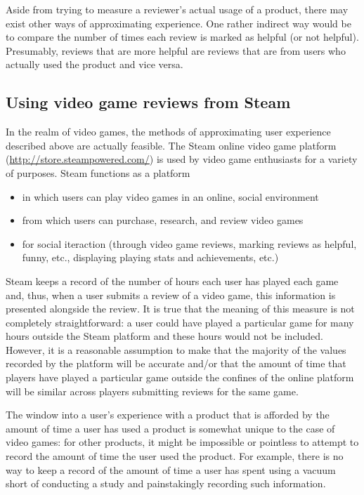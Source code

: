 \documentclass[9pt]{article}
\begin{document}
Aside from trying to measure a reviewer's actual usage of a product, there may exist other ways of approximating experience. One rather indirect way would be to compare the number of times each review is marked as helpful (or not helpful). Presumably, reviews that are more helpful are reviews that are from users who actually used the product and vice versa.

\subsection{Using video game reviews from Steam}

In the realm of video games, the methods of approximating user experience described above are actually feasible. The Steam online video game platform (\url{http://store.steampowered.com/}) is used by video game enthusiasts for a variety of purposes. Steam functions as a platform

\begin{itemize}
\item in which users can play video games in an online, social environment
\item from which users can purchase, research, and review video games
\item for social iteraction (through video game reviews, marking reviews as helpful, funny, etc., displaying playing stats and achievements, etc.)
\end{itemize}

Steam keeps a record of the number of hours each user has played each game and, thus, when a user submits a review of a video game, this information is presented alongside the review. It is true that the meaning of this measure is not completely straightforward: a user could have played a particular game for many hours outside the Steam platform and these hours would not be included. However, it is a reasonable assumption to make that the majority of the values recorded by the platform will be accurate and/or that the amount of time that players have played a particular game outside the confines of the online platform will be similar across players submitting reviews for the same game.

The window into a user's experience with a product that is afforded by the amount of time a user has used a product is somewhat unique to the case of video games: for other products, it might be impossible or pointless to attempt to record the amount of time the user used the product. For example, there is no way to keep a record of the amount of time a user has spent using a vacuum short of conducting a study and painstakingly recording such information.
\end{document}
